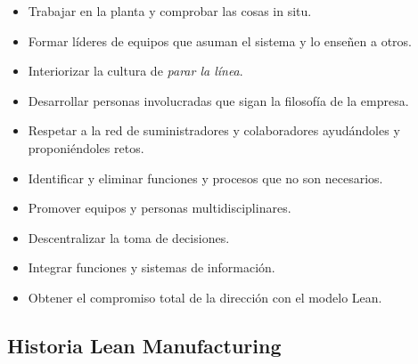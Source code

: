 \begin{itemize}
\item Trabajar en la planta y comprobar las cosas in situ.
\item Formar líderes de equipos que asuman el sistema y lo enseñen a otros.
\item Interiorizar la cultura de \textit{parar la línea}.
\item Desarrollar personas involucradas que sigan la filosofía de la empresa.
\item Respetar a la red de suministradores y colaboradores ayudándoles y proponiéndoles retos.
\item Identificar y eliminar funciones y procesos que no son necesarios.
\item Promover equipos y personas multidisciplinares.
\item Descentralizar la toma de decisiones.
\item Integrar funciones y sistemas de información.
\item Obtener el compromiso total de la dirección con el modelo Lean.
\end{itemize}

\subsection{Historia Lean Manufacturing}

